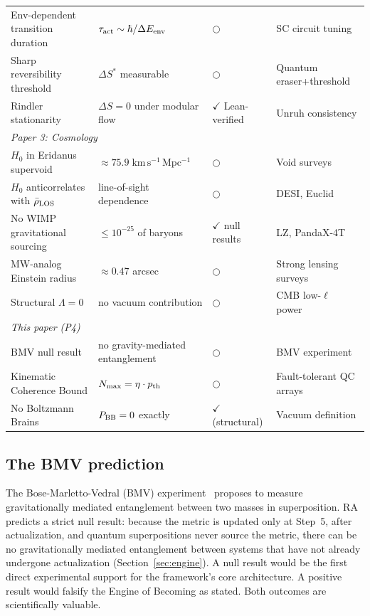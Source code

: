 \documentclass[11pt,twocolumn]{article}
\theoremstyle{plain}
\theoremstyle{remark}
\begin{document}
\begin{table}[t]
\begin{tabular}{p{4.5cm}p{3.5cm}lp{3cm}}
Env-dependent transition duration & $\tau_{\rm act} \sim \hbar/\Delta E_{\rm env}$ & $\bigcirc$ & SC circuit tuning \\
Sharp reversibility threshold & $\Delta S^*$ measurable & $\bigcirc$ & Quantum eraser+threshold \\
Rindler stationarity & $\Delta S = 0$ under modular flow & $\checkmark$ Lean-verified & Unruh consistency \\
\midrule
\multicolumn{4}{l}{\textit{Paper 3: Cosmology}} \\[2pt]
$H_0$ in Eridanus supervoid & $\approx 75.9\;\mathrm{km\,s^{-1}\,Mpc^{-1}}$ & $\bigcirc$ & Void surveys \\
$H_0$ anticorrelates with $\bar\rho_{\rm LOS}$ & line-of-sight dependence & $\bigcirc$ & DESI, Euclid \\
No WIMP gravitational sourcing & $\leq 10^{-25}$ of baryons & $\checkmark$ null results & LZ, PandaX-4T \\
MW-analog Einstein radius & $\approx 0.47$ arcsec & $\bigcirc$ & Strong lensing surveys \\
Structural $\Lambda = 0$ & no vacuum contribution & $\bigcirc$ & CMB low-$\ell$ power \\
\midrule
\multicolumn{4}{l}{\textit{This paper (P4)}} \\[2pt]
BMV null result & no gravity-mediated entanglement & $\bigcirc$ & BMV experiment \\
Kinematic Coherence Bound & $N_{\rm max} = \eta\cdot p_{\rm th}$ & $\bigcirc$ & Fault-tolerant QC arrays \\
No Boltzmann Brains & $P_{\rm BB} = 0$ exactly & $\checkmark$ (structural) & Vacuum definition \\
\bottomrule
\end{tabular}
\end{table}

\subsection{The BMV prediction}

The Bose-Marletto-Vedral (BMV) experiment~\cite{Bose2017,Marletto2017}
proposes to measure gravitationally mediated entanglement between
two masses in superposition.
RA predicts a strict null result: because the metric is updated only
at Step~5, after actualization, and quantum superpositions never
source the metric, there can be no gravitationally mediated
entanglement between systems that have not already undergone
actualization (Section~\ref{sec:engine}).
A null result would be the first direct experimental support for the
framework's core architecture.
A positive result would falsify the Engine of Becoming as stated.
Both outcomes are scientifically valuable.
\end{document}
